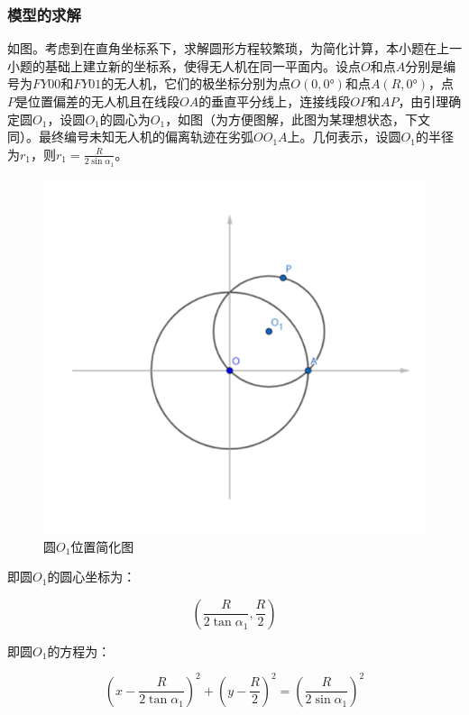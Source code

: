 \subsubsection{模型的求解}

如图。考虑到在直角坐标系下，求解圆形方程较繁琐，为简化计算，本小题在上一小题的基础上建立新的坐标系，使得无人机在同一平面内。设点$O$和点$A$分别是编号为$FY00$和$FY01$的无人机，它们的极坐标分别为点$O(0,0°)$和点$A(R,0°)$，点$P$是位置偏差的无人机且在线段$OA$的垂直平分线上，连接线段$OP$和$AP$，由引理确定圆$O_1$，设圆$O_1$的圆心为$O_1$，如图（为方便图解，此图为某理想状态，下文同）。最终编号未知无人机的偏离轨迹在劣弧$OO_1A$上。几何表示，设圆$O_1$的半径为$r_1$，则$r_1=\frac{R}{2\sin\alpha_1}$。

\begin{figure}[h]
    \centering
    \includegraphics{res/figure102034.png}
    \caption{圆$O_1$位置简化图}
\end{figure}

即圆$O_1$的圆心坐标为：

\begin{equation*}
    \left(
        \frac{R}{2\tan\alpha_1},\frac{R}{2}
    \right)
\end{equation*}

即圆$O_1$的方程为：

\begin{equation}
    \left(
        x - \frac{R}{2\tan\alpha_1}
    \right)^2
    +
    \left(
        y - \frac{R}{2}
    \right)^2
    =
    \left(
        \frac{R}{2\sin\alpha_1}
    \right)^2
\end{equation}

